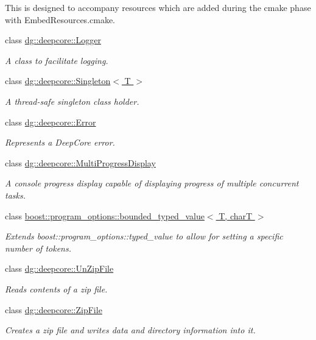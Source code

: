 \begin{DoxyCompactItemize}
\begin{DoxyCompactList}
This is designed to accompany resources which are added during the cmake phase with Embed\+Resources.\+cmake. \end{DoxyCompactList}\item 
class \hyperlink{classdg_1_1deepcore_1_1_logger}{dg\+::deepcore\+::\+Logger}
\begin{DoxyCompactList}\small\item\em A class to facilitate logging. \end{DoxyCompactList}\item 
class \hyperlink{classdg_1_1deepcore_1_1_singleton}{dg\+::deepcore\+::\+Singleton$<$ T $>$}
\begin{DoxyCompactList}\small\item\em A thread-\/safe singleton class holder. \end{DoxyCompactList}\item 
class \hyperlink{classdg_1_1deepcore_1_1_error}{dg\+::deepcore\+::\+Error}
\begin{DoxyCompactList}\small\item\em Represents a Deep\+Core error. \end{DoxyCompactList}\item 
class \hyperlink{classdg_1_1deepcore_1_1_multi_progress_display}{dg\+::deepcore\+::\+Multi\+Progress\+Display}
\begin{DoxyCompactList}\small\item\em A console progress display capable of displaying progress of multiple concurrent tasks. \end{DoxyCompactList}\item 
class \hyperlink{classboost_1_1program__options_1_1bounded__typed__value}{boost\+::program\+\_\+options\+::bounded\+\_\+typed\+\_\+value$<$ T, char\+T $>$}
\begin{DoxyCompactList}\small\item\em Extends boost\+::program\+\_\+options\+::typed\+\_\+value to allow for setting a specific number of tokens. \end{DoxyCompactList}\item 
class \hyperlink{classdg_1_1deepcore_1_1_un_zip_file}{dg\+::deepcore\+::\+Un\+Zip\+File}
\begin{DoxyCompactList}\small\item\em Reads contents of a zip file. \end{DoxyCompactList}\item 
class \hyperlink{classdg_1_1deepcore_1_1_zip_file}{dg\+::deepcore\+::\+Zip\+File}
\begin{DoxyCompactList}\small\item\em Creates a zip file and writes data and directory information into it. \end{DoxyCompactList}\end{DoxyCompactItemize}
